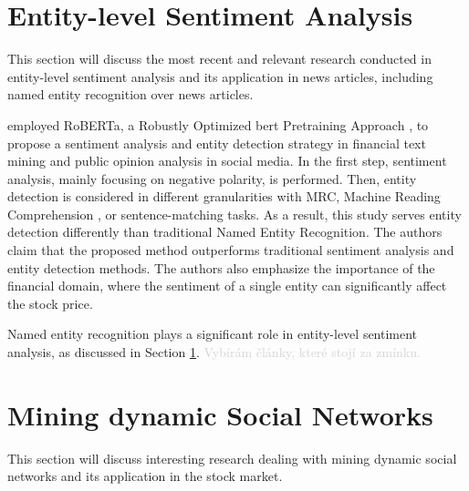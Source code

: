 \section{Entity-level Sentiment Analysis}
\label{sec:entity-level-sentiment-analysis}
This section will discuss the most recent and relevant research conducted in entity-level sentiment analysis and its application in news articles, including named entity recognition over news articles.

\cite{zhao2021bert} employed RoBERTa,  a Robustly Optimized \acrfull{bert} Pretraining Approach \parencite{liu2019roberta}, to propose a sentiment analysis and entity detection strategy in financial text mining and public opinion analysis in social media. In the first step, sentiment analysis, mainly focusing on negative polarity, is performed. Then, entity detection is considered in different granularities with MRC, Machine Reading Comprehension \parencite{liu2019mrc}, or sentence-matching tasks. As a result, this study serves entity detection differently than traditional Named Entity Recognition. The authors claim that the proposed method outperforms traditional sentiment analysis and entity detection methods. The authors also emphasize the importance of the financial domain, where the sentiment of a single entity can significantly affect the stock price.

Named entity recognition plays a significant role in entity-level
sentiment analysis, as discussed in Section \ref{sec:entity-level-sentiment-analysis}. \textcolor{lightgray}{Vybírám články, které stojí za zmínku.}

\section{Mining dynamic Social Networks}
\label{sec:mining-dynamic-social-networks}
This section will discuss interesting research \cite{Jin2012} dealing with mining dynamic social networks and its application in the stock market. 

